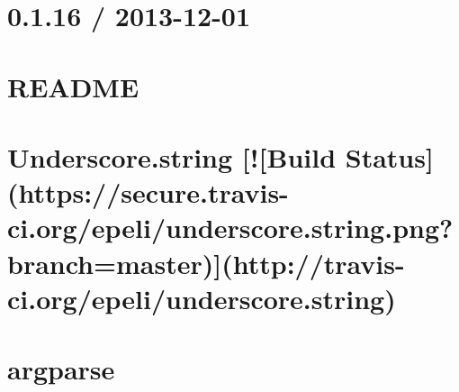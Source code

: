 \documentclass[twoside]{book}
\newcommand{\+}{\discretionary{\mbox{\scriptsize$\hookleftarrow$}}{}{}}
\begin{document}
\chapter{0.1.16 / 2013-\/12-\/01}
\label{md__c_1__users_martin__documents__git_hub_visual_studio__bachelor__wis_r__wis_r_node_modules_gru93f702fd853eeefd749d9b236ee5f082}
\hypertarget{md__c_1__users_martin__documents__git_hub_visual_studio__bachelor__wis_r__wis_r_node_modules_gru93f702fd853eeefd749d9b236ee5f082}{}

\chapter{R\+E\+A\+D\+M\+E}
\label{md__c_1__users_martin__documents__git_hub_visual_studio__bachelor__wis_r__wis_r_node_modules_gruad06088b93eeb6d751e4563ec018785c}
\hypertarget{md__c_1__users_martin__documents__git_hub_visual_studio__bachelor__wis_r__wis_r_node_modules_gruad06088b93eeb6d751e4563ec018785c}{}

\chapter{Underscore.\+string \mbox{[}!\mbox{[}Build Status\mbox{]}(https\+://secure.travis-\/ci.org/epeli/underscore.string.\+png?branch=master)\mbox{]}(http\+://travis-\/ci.org/epeli/underscore.string)}
\label{md__c_1__users_martin__documents__git_hub_visual_studio__bachelor__wis_r__wis_r_node_modules_gru415c90701b9a0312caee3b425ef6c26e}
\hypertarget{md__c_1__users_martin__documents__git_hub_visual_studio__bachelor__wis_r__wis_r_node_modules_gru415c90701b9a0312caee3b425ef6c26e}{}

\chapter{argparse}
\label{md__c_1__users_martin__documents__git_hub_visual_studio__bachelor__wis_r__wis_r_node_modules_gru5cd2de99e215a50c8e40a48848b71f29}
\hypertarget{md__c_1__users_martin__documents__git_hub_visual_studio__bachelor__wis_r__wis_r_node_modules_gru5cd2de99e215a50c8e40a48848b71f29}{}

\end{document}

